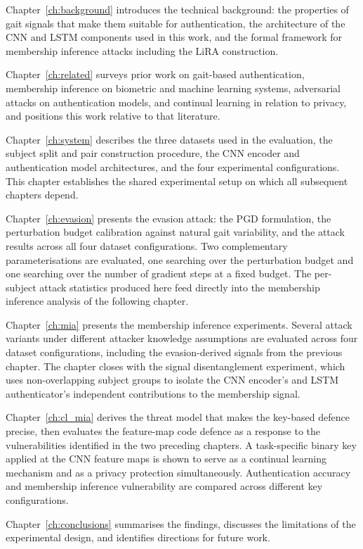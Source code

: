 Chapter~\ref{ch:background} introduces the technical background: the properties of gait signals that make them suitable for authentication, the architecture of the CNN and LSTM components used in this work, and the formal framework for membership inference attacks including the LiRA construction.

Chapter~\ref{ch:related} surveys prior work on gait-based authentication, membership inference on biometric and machine learning systems, adversarial attacks on authentication models, and continual learning in relation to privacy, and positions this work relative to that literature.

Chapter~\ref{ch:system} describes the three datasets used in the evaluation, the subject split and pair construction procedure, the CNN encoder and authentication model architectures, and the four experimental configurations. This chapter establishes the shared experimental setup on which all subsequent chapters depend.

Chapter~\ref{ch:evasion} presents the evasion attack: the PGD formulation, the perturbation budget calibration against natural gait variability, and the attack results across all four dataset configurations. Two complementary parameterisations are evaluated, one searching over the perturbation budget and one searching over the number of gradient steps at a fixed budget. The per-subject attack statistics produced here feed directly into the membership inference analysis of the following chapter.

Chapter~\ref{ch:mia} presents the membership inference experiments. Several attack variants under different attacker knowledge assumptions are evaluated across four dataset configurations, including the evasion-derived signals from the previous chapter. The chapter closes with the signal disentanglement experiment, which uses non-overlapping subject groups to isolate the CNN encoder's and LSTM authenticator's independent contributions to the membership signal.

Chapter~\ref{ch:cl_mia} derives the threat model that makes the key-based defence precise, then evaluates the feature-map code defence as a response to the vulnerabilities identified in the two preceding chapters. A task-specific binary key applied at the CNN feature maps is shown to serve as a continual learning mechanism and as a privacy protection simultaneously. Authentication accuracy and membership inference vulnerability are compared across different key configurations.

Chapter~\ref{ch:conclusions} summarises the findings, discusses the limitations of the experimental design, and identifies directions for future work.
